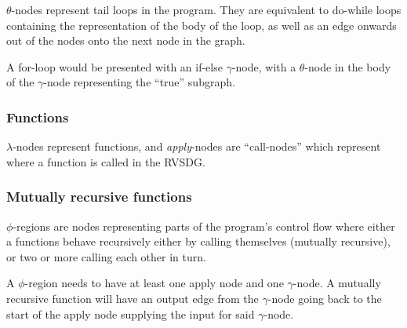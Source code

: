 \textit{$\theta$}-nodes represent tail loops in the program. They are equivalent
to do-while loops containing the representation of the body of the loop, as well
as an edge onwards out of the nodes onto the next node in the graph.

A for-loop would be presented with an if-else $\gamma$-node, with a
$\theta$-node in the body of the $\gamma$-node representing the ``true''
subgraph.

\subsubsection{Functions}

\textit{$\lambda$}-nodes represent functions, and \textit{apply}-nodes are
``call-nodes'' which represent where a function is called in the RVSDG.

\subsubsection{Mutually recursive functions}

\textit{$\phi$}-regions are nodes representing parts of the program's
control flow where either a functions behave recursively either by calling
themselves (mutually recursive), or two or more calling each other in turn.

A $\phi$-region needs to have at least one apply node and one $\gamma$-node. A
mutually recursive function will have an output edge from the $\gamma$-node
going back to the start of the apply node supplying the input for said
$\gamma$-node.

